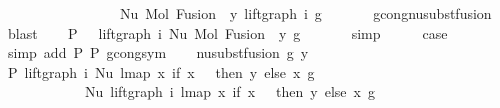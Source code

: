 \begin{isabellebody}
\ \ \ \ \ \ \ \ \ \ \ \ \ \ \ \ \ Nu\ {\isacharparenleft}{\kern0pt}Mol\ {\isacharparenleft}{\kern0pt}Fusion\ {}\ y{\isacharparenright}{\kern0pt}\ {\isacharparenleft}{\kern0pt}lift{\isacharunderscore}{\kern0pt}graph\ i\ g{\isacharparenright}{\kern0pt}{\isacharparenright}{\kern0pt}{\isachardoublequoteclose}\isanewline
\ \ \ \ \ \isamarkupfalse%
\ gcong{\isachardot}{\kern0pt}nu{\isacharunderscore}{\kern0pt}subst{\isacharunderscore}{\kern0pt}fusion{}\ \isamarkupfalse%
\ blast\isanewline
\ \ \isamarkupfalse%
\ P{}{\isacharcolon}{\kern0pt}\ {\isachardoublequoteopen}{\isachardot}{\kern0pt}{\isachardot}{\kern0pt}{\isachardot}{\kern0pt}\ {\isacharequal}{\kern0pt}\ lift{\isacharunderscore}{\kern0pt}graph\ i\ {\isacharparenleft}{\kern0pt}Nu\ {\isacharparenleft}{\kern0pt}Mol\ {\isacharparenleft}{\kern0pt}Fusion\ {}\ y{\isacharparenright}{\kern0pt}\ g{\isacharparenright}{\kern0pt}{\isacharparenright}{\kern0pt}{\isachardoublequoteclose}\isanewline
\ \ \ \ \ \isamarkupfalse%
\ simp\isanewline
\ \ \isamarkupfalse%
\ \isamarkupfalse%
\ {\isacharquery}{\kern0pt}case\isanewline
\ \ \ \ \ \isamarkupfalse%
\ {\isacharparenleft}{\kern0pt}simp\ add{\isacharcolon}{\kern0pt}\ P{}\ P{}\ gcong{\isachardot}{\kern0pt}sym{\isacharparenright}{\kern0pt}\isanewline
{}\isamarkupfalse%
\isanewline
\ \ \isamarkupfalse%
\ {\isacharparenleft}{\kern0pt}nu{\isacharunderscore}{\kern0pt}subst{\isacharunderscore}{\kern0pt}fusion{}\ g\ y{\isacharparenright}{\kern0pt}\isanewline
\ \ \isamarkupfalse%
\ P{}{\isacharcolon}{\kern0pt}\ {\isachardoublequoteopen}lift{\isacharunderscore}{\kern0pt}graph\ i\ {\isacharparenleft}{\kern0pt}Nu\ {\isacharparenleft}{\kern0pt}lmap\ {\isacharparenleft}{\kern0pt}{\isasymlambda}x{\isachardot}{\kern0pt}\ if\ x\ {\isacharequal}{\kern0pt}\ {}\ then\ y\ else\ x{\isacharparenright}{\kern0pt}\ g{\isacharparenright}{\kern0pt}{\isacharparenright}{\kern0pt}\ {\isacharequal}{\kern0pt}\isanewline
\ \ \ \ \ \ \ \ \ \ \ \ Nu\ {\isacharparenleft}{\kern0pt}lift{\isacharunderscore}{\kern0pt}graph\ i\ {\isacharparenleft}{\kern0pt}lmap\ {\isacharparenleft}{\kern0pt}{\isasymlambda}x{\isachardot}{\kern0pt}\ if\ x\ {\isacharequal}{\kern0pt}\ {}\ then\ y\ else\ x{\isacharparenright}{\kern0pt}\ g{\isacharparenright}{\kern0pt}{\isacharparenright}{\kern0pt}{\isachardoublequoteclose}\isanewline

\end{isabellebody}
